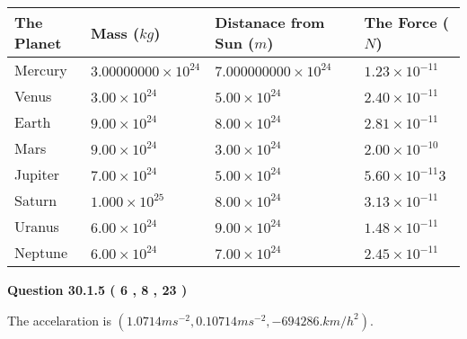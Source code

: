 \documentclass[12pt]{article}
\begin{document}
 
\begin{tabular}{|l|l|l|l|}
\hline
The Planet & Mass ($kg$) & Distanace from Sun ($m$) & The Force ($N$)\\
\hline
Mercury  &
           $ %
3.00000000 \times 10^{24}  $   &
             $ %
7.000000000 \times 10^{24}$    & $ %
1.23 \times 10^{-11} $
\\  \hline
Venus    &
           $  %
3.00 \times 10^{24}  $     &
             $ %
5.00 \times 10^{24} $    & $ %
2.40 \times 10^{-11} $
\\  \hline
Earth    &
           $  %
9.00 \times 10^{24}$     &
             $ %
8.00 \times 10^{24} $    & $ %
2.81 \times 10^{-11} $
\\   \hline
Mars     &
           $  %
9.00 \times 10^{24} $     &
             $ %
3.00 \times 10^{24}$    & $ %
2.00 \times 10^{-10} $
\\   \hline
Jupiter  &
           $  %
7.00 \times 10^{24}  $    &
             $ %
5.00 \times 10^{24} $    & $ %
5.60 \times 10^{-11}3 $
\\  \hline
Saturn   &
           $  %
1.000 \times 10^{25}   $    &
             $ %
8.00 \times 10^{24}  $    & $ %
3.13 \times 10^{-11} $
\\  \hline
Uranus   &
           $  %
6.00 \times 10^{24} $    &
             $ %
9.00 \times 10^{24}$    & $ %
1.48 \times 10^{-11} $
\\  \hline
Neptune  &
           $  %
6.00 \times 10^{24}  $    &
             $ %
7.00 \times 10^{24} $    & $ %
2.45 \times 10^{-11} $
\\  \hline
 
\end{tabular}
 
 
 
 
  
\vspace{0.2in}
  
{\textbf{\Large{Question
30.1.5 
 (           6 ,           8 ,          23 )
}}}
  
  
 
 
\noindent{}
 
 
The accelaration is
$(
1.0714ms^{-2},
0.10714ms^{-2},
-694286.km/h^2
).
$
 
 
 
 
  
\vspace{0.2in}
  
\end{document}
